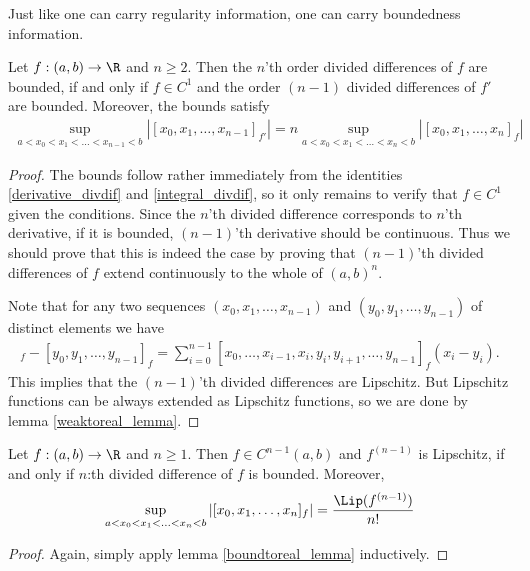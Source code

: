Just like one can carry regularity information, one can carry boundedness information.

\begin{lem}\label{boundtoreal_lemma}
	Let $f : (a, b) \to \R$ and $n \geq 2$. Then the $n$'th order divided differences of $f$ are bounded, if and only if $f \in C^{1}$ and the order $(n - 1)$ divided differences of $f'$ are bounded. Moreover, the bounds satisfy
	\begin{align*}
		\sup_{a < x_{0} < x_{1} < \ldots < x_{n - 1} < b} |[x_{0}, x_{1}, \ldots, x_{n - 1}]_{f'}| = n \sup_{a < x_{0} < x_{1} < \ldots < x_{n}< b} |[x_{0}, x_{1}, \ldots, x_{n}]_{f}|
	\end{align*}
\end{lem}
\begin{proof}
	The bounds follow rather immediately from the identities \ref{derivative_divdif} and \ref{integral_divdif}, so it only remains to verify that $f \in C^{1}$ given the conditions. Since the $n$'th divided difference corresponds to $n$'th derivative, if it is bounded, $(n - 1)$'th derivative should be continuous. Thus we should prove that this is indeed the case by proving that $(n - 1)$'th divided differences of $f$ extend continuously to the whole of $(a, b)^{n}$.

	Note that for any two sequences $(x_{0}, x_{1}, \ldots, x_{n - 1})$ and $(y_{0}, y_{1}, \ldots, y_{n - 1})$ of distinct elements we have
	\begin{align*}
		[x_{0}, x_{1}, \ldots, x_{n - 1}]_{f} - [y_{0}, y_{1}, \ldots, y_{n - 1}]_{f} = \sum_{i = 0}^{n - 1} [x_{0}, \ldots, x_{i - 1}, x_{i}, y_{i}, y_{i + 1}, \ldots, y_{n - 1}]_{f} (x_{i} - y_{i}).
	\end{align*}
	This implies that the $(n - 1)$'th divided differences are Lipschitz. But Lipschitz functions can be always extended as Lipschitz functions, so we are done by lemma \ref{weaktoreal_lemma}.
\end{proof}

\begin{lause}\label{bounded_div}
	Let $f : (a, b) \to \R$ and $n \geq 1$. Then $f \in C^{n - 1}(a, b)$ and $f^{(n - 1)}$ is Lipschitz, if and only if $n$:th divided difference of $f$ is bounded. Moreover,
	\begin{align*}
		\sup_{a < x_{0} < x_{1} < \ldots < x_{n}< b} |[x_{0}, x_{1}, \ldots, x_{n}]_{f}| = \frac{\Lip(f^{(n - 1)})}{n!}
	\end{align*}
\end{lause}
\begin{proof}
	Again, simply apply lemma \ref{boundtoreal_lemma} inductively.
\end{proof}

